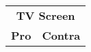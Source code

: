 \begin{table}[h]
\begin{tabular}{ll}
\multicolumn{2}{c}{\textbf{TV Screen}}                                                                                                                                                                                                                                                                                                                                                                                                                                                                                                                                                                                                                                                                                                                                                                                                                                                                                \\
\textbf{Pro}                                                                                                                                                                                                                                                                                                                                                                                                         & \textbf{Contra}                                                                                                                                                                                                                                                                                                                                                                                                                                                                                \\

\end{tabular}
\end{table}
